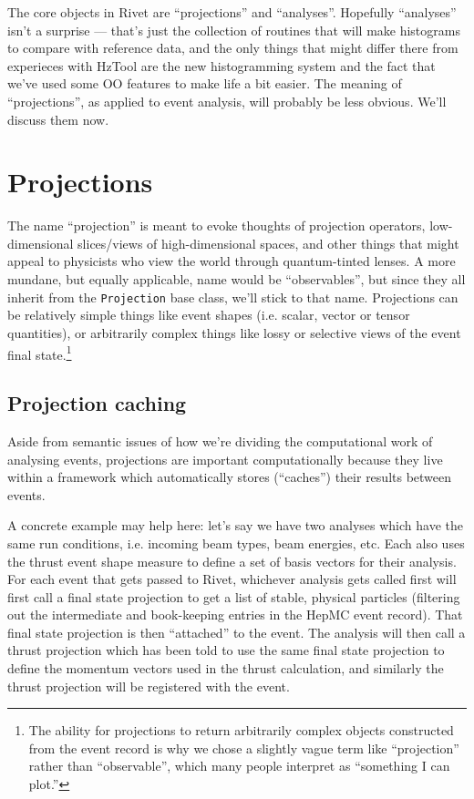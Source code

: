 \documentclass{JHEP3}
\newcommand{\kbd}[1]{\texttt{#1}\xspace}
\begin{document}
The core objects in Rivet are ``projections'' and ``analyses''. Hopefully
``analyses'' isn't a surprise --- that's just the collection of routines that
will make histograms to compare with reference data, and the only things that
might differ there from experieces with HzTool are the new histogramming system
and the fact that we've used some OO features to make life a bit easier. The
meaning of ``projections'', as applied to event analysis, will probably be less
obvious. We'll discuss them now.


\section{Projections}
The name ``projection'' is meant to evoke thoughts of
projection operators, low-dimensional slices/views of high-dimensional spaces,
and other things that might appeal to physicists who view the world through
quantum-tinted lenses. A more mundane, but equally applicable, name would be
``observables'', but since they all inherit from the \kbd{Projection} base
class, we'll stick to that name. Projections can be relatively simple things
like event shapes (i.e. scalar, vector or tensor quantities), or arbitrarily
complex things like lossy or selective views of the event final
state.\footnote{The ability for projections to return arbitrarily complex objects
  constructed from the event record is why we chose a slightly vague term like
  ``projection'' rather than ``observable'', which many people interpret as
  ``something I can plot.''}

\subsection{Projection caching}
Aside from semantic issues of how we're dividing the computational work of
analysing events, projections are important computationally because they live
within a framework which automatically stores (``caches'') their results between
events.

A concrete example may help here: let's say we have two analyses which
have the same run conditions, i.e. incoming beam types, beam energies, etc. Each
also uses the thrust event shape measure to define a set of basis vectors for
their analysis. For each event that gets passed to Rivet, whichever analysis
gets called first will first call a final state projection to get a list of
stable, physical particles (filtering out the intermediate and book-keeping
entries in the HepMC event record). That final state projection is then
``attached'' to the event. The analysis will then call a thrust projection which
has been told to use the same final state projection to define the momentum
vectors used in the thrust calculation, and similarly the thrust projection will
be registered with the event.
\end{document}
